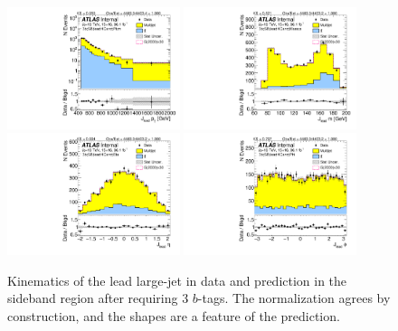 \clearpage

\begin{figure}[htbp!]
\begin{center}
\includegraphics[width=0.45\textwidth,angle=-90]{figures/boosted/Sideband/b77_ThreeTag_Sideband_leadHCand_Pt_m_1.pdf}
\includegraphics[width=0.45\textwidth,angle=-90]{figures/boosted/Sideband/b77_ThreeTag_Sideband_leadHCand_Mass_s.pdf}\\
\includegraphics[width=0.45\textwidth,angle=-90]{figures/boosted/Sideband/b77_ThreeTag_Sideband_leadHCand_Eta.pdf}
\includegraphics[width=0.45\textwidth,angle=-90]{figures/boosted/Sideband/b77_ThreeTag_Sideband_leadHCand_Phi.pdf}
  \caption{Kinematics of the lead large-\R jet in data and prediction in the sideband region after requiring 3 $b$-tags. The normalization agrees by construction, and the shapes are a feature of the prediction.}
  \label{fig:boosted-3b-sideband-ak10-lead}
\end{center}
\end{figure}

